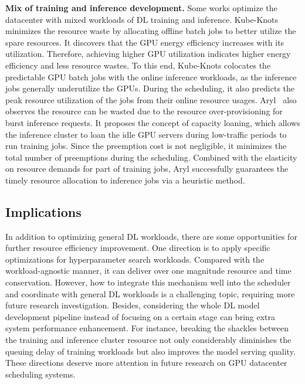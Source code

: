 \textbf{Mix of training and inference development.}
Some works optimize the datacenter with mixed workloads of DL training and inference.
Kube-Knots~\cite{Thinakaran2019kubeknots} minimizes the resource waste by allocating offline batch jobs to better utilize the spare resources. It discovers that the GPU energy efficiency increases with its utilization. Therefore, achieving higher GPU utilization indicates higher energy efficiency and less resource wastes. To this end, Kube-Knots colocates the predictable GPU batch jobs with the online inference workloads, as the inference jobs generally underutilize the GPUs. During the scheduling, it also predicts the peak resource utilization of the jobs from their online resource usages.
Aryl~\cite{Aryl} also observes the resource can be wasted due to the resource over-provisioning for burst inference requests. It proposes the concept of capacity loaning, which allows the inference cluster to loan the idle GPU servers during low-traffic periods to run training jobs. Since the preemption cost is not negligible, it minimizes the total number of preemptions during the scheduling. Combined with the elasticity on resource demands for part of training jobs, Aryl successfully guarantees the timely resource allocation to inference jobs via a heuristic method.


\subsection{Implications}

In addition to optimizing general DL workloads, there are some opportunities for further resource efficiency improvement. One direction is to apply specific optimizations for hyperparameter search workloads. Compared with the workload-agnostic manner, it can deliver over one magnitude resource and time conservation. However, how to integrate this mechanism well into the scheduler and coordinate with general DL workloads is a challenging topic, requiring more future research investigation. Besides, considering the whole DL model development pipeline instead of focusing on a certain stage can bring extra system performance enhancement. For instance, breaking the shackles between the training and inference cluster resource not only considerably diminishes the queuing delay of training workloads but also improves the model serving quality. These directions deserve more attention in future research on GPU datacenter scheduling systems.


